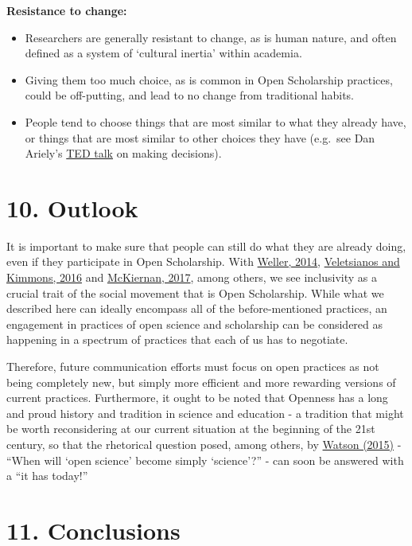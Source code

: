 \textbf{Resistance to change:}

\begin{itemize}
\item
  Researchers are generally resistant to change, as is human nature, and
  often defined as a system of `cultural inertia' within academia.
\item
  Giving them too much choice, as is common in Open Scholarship
  practices, could be off-putting, and lead to no change from
  traditional habits.
\item
  People tend to choose things that are most similar to what they
  already have, or things that are most similar to other choices they
  have (e.g.~see Dan Ariely's
  \href{https://www.ted.com/talks/dan_ariely_asks_are_we_in_control_of_our_own_decisions}{TED
  talk} on making decisions).
\end{itemize}

\section{10. Outlook }\label{outlook}

It is important to make sure that people can still do what they are
already doing, even if they participate in Open Scholarship. With
\href{https://doi.org/10.5334/bam}{Weller, 2014},
\href{https://doi.org/10.19173/irrodl.v13i4.1313}{Veletsianos and
Kimmons, 2016} and
\href{https://doi.org/10.1371/journal.pbio.1002614}{McKiernan, 2017},
among others, we see inclusivity as a crucial trait of the social
movement that is Open Scholarship. While what we described here can
ideally encompass all of the before-mentioned practices, an engagement
in practices of open science and scholarship can be considered as
happening in a spectrum of practices that each of us has to negotiate.

Therefore, future communication efforts must focus on open practices as
not being completely new, but simply more efficient and more rewarding
versions of current practices. Furthermore, it ought to be noted that
Openness has a long and proud history and tradition in science and
education - a tradition that might be worth reconsidering at our current
situation at the beginning of the 21st century, so that the rhetorical
question posed, among others, by
\href{https://doi.org/10.1186/s13059-015-0669-2}{Watson (2015)} - ``When
will `open science' become simply `science'?'' - can soon be answered
with a ``it has today!''

\section{11. Conclusions }\label{conclusions}

